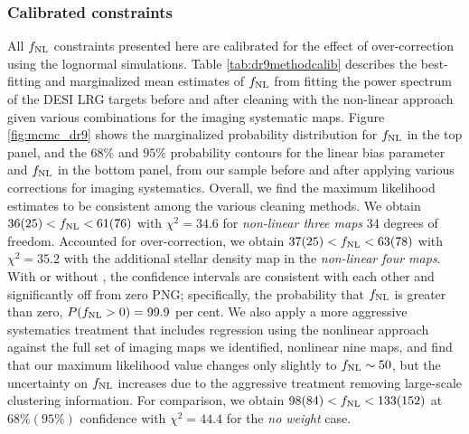 \subsubsection{Calibrated constraints}
All $f_{\rm NL}$ constraints presented here are calibrated for the effect of over-correction using the lognormal simulations. Table \ref{tab:dr9methodcalib} describes the best-fitting and marginalized mean estimates of $f_{\rm NL}$ from fitting the power spectrum of the DESI LRG targets before and after cleaning with the non-linear approach given various combinations for the imaging systematic maps. Figure \ref{fig:mcmc_dr9} shows the marginalized probability distribution for $f_{\rm NL}$ in the top panel, and the $68\%$ and $95\%$ probability contours for the linear bias parameter and $f_{\rm NL}$ in the bottom panel, from our sample before and after applying various corrections for imaging systematics. Overall, we find the maximum likelihood estimates to be consistent among the various cleaning methods. We obtain $36 (25) < f_{\rm NL} < 61(76)$  with $\chi^{2}=34.6$ for \textit{non-linear three maps}  34 degrees of freedom. Accounted for over-correction, we obtain $37(25) < f_{\rm NL} < 63(78)$ with $\chi^{2}=35.2$ with the additional stellar density map in the \textit{non-linear four maps}. With or without , the confidence intervals are consistent with each other and significantly off from zero PNG; specifically, the probability that $f_{\rm NL}$ is greater than zero, $P(f_{\rm NL} >0)=99.9$ per cent. We also apply a more aggressive systematics treatment that includes regression using the nonlinear approach against the full set of imaging maps we identified, nonlinear nine maps, and find that our maximum
likelihood value changes only slightly to $f_{\rm NL} \sim 50$, but the uncertainty on $f_{\rm NL}$ increases due
to the aggressive treatment removing large-scale clustering information. For comparison, we obtain $98(84) < f_{\rm NL} < 133(152)$ at $68\% (95\%)$ confidence with $\chi^{2}=44.4$ for the \textit{no weight} case.


